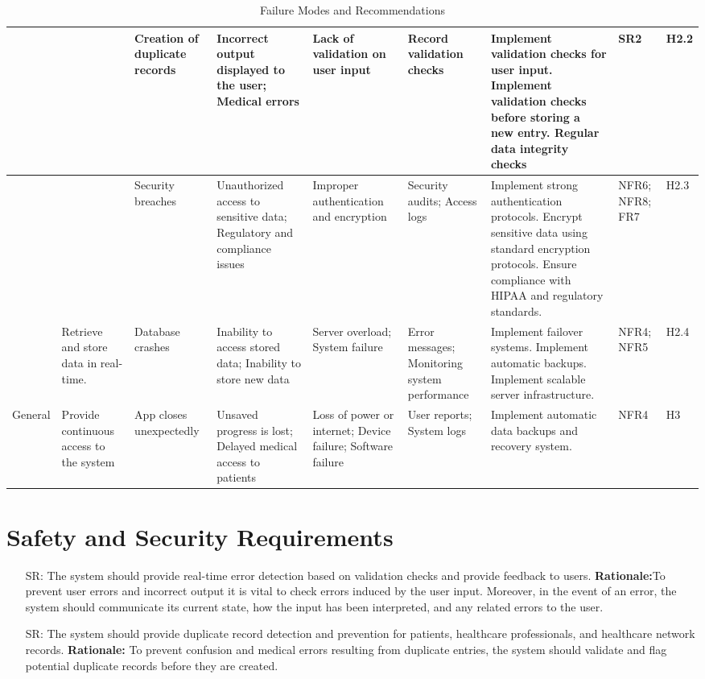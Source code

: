 \documentclass{article}
\newcounter{srnum} %
\begin{document}
\begin{landscape}
\begin{table}[H]
\begin{tabular}{p{1cm} p{2cm} p{2cm} p{2cm} p{2cm} p{2cm} p{4cm} p{1cm} p{1cm}}
        \midrule
        & & Creation of duplicate records & Incorrect output displayed to the user; Medical errors & Lack of validation on user input & Record validation checks & Implement validation checks for user input. Implement validation checks before storing a new entry. Regular data integrity checks & SR2 & H2.2 \\ 
        \midrule
        & & Security breaches & Unauthorized access to sensitive data; Regulatory and compliance issues & Improper authentication and encryption & Security audits; Access logs & Implement strong authentication protocols. Encrypt sensitive data using standard encryption protocols. Ensure compliance with HIPAA and regulatory standards. & NFR6; NFR8; FR7 & H2.3 \\ 
        \midrule
        & Retrieve and store data in real-time. & Database crashes & Inability to access stored data; Inability to store new data & Server overload; System failure & Error messages; Monitoring system performance & Implement failover systems. Implement automatic backups. Implement scalable server infrastructure. & NFR4; NFR5 & H2.4 \\ 
        \midrule
        General & Provide continuous access to the system & App closes unexpectedly & Unsaved progress is lost; Delayed medical access to patients & Loss of power or internet; Device failure; Software failure & User reports; System logs & Implement automatic data backups and recovery system. & NFR4 & H3 \\ 
        \bottomrule
    \end{tabular}
    \caption{Failure Modes and Recommendations}
    \label{tab:failure_modes}
\end{table}
\end{landscape}

\section{Safety and Security Requirements}


\begin{itemize}
    \item[SR\refstepcounter{srnum}\thesrnum \label{SR_ErrorDetection}:] The system should provide real-time error detection based on validation checks and provide feedback to users.
    \textbf{Rationale:}To prevent user errors and incorrect output it is vital to check errors induced by the user input. Moreover, in the event of an error, the system should communicate its current state, how the input has been interpreted, and any related errors to the user.
    
    \item [SR\refstepcounter{srnum}\thesrnum \label{SR_DuplicateRecordDetection}:] The system should provide duplicate record detection and prevention for patients, healthcare professionals, and healthcare network records.
    \textbf{Rationale:} To prevent confusion and medical errors resulting from duplicate entries, the system should validate and flag potential duplicate records before they are created.
\end{itemize}
\end{document}
